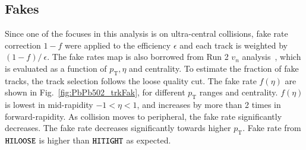 \subsection{Fakes}
Since one of the focuses in this analysis is on ultra-central collisions, fake rate correction $1-f$ were applied to the efficiency $\epsilon$ and each track is weighted by $(1-f)/\ \epsilon$. The fake rates map is also borrowed from Run 2 $v_n$ analysis~\cite{Burka:2151932}, which is evaluated as a function of $p_{\text{T}}, \eta$ and centrality. To estimate the fraction of fake tracks, the track selection follows the loose quality cut. The fake rate $f(\eta)$ are shown in Fig.~\ref{fig:PbPb502_trkFak}, for different $p_{\text{T}}$ ranges and centrality. $f(\eta)$ is lowest in mid-rapidity $-1<\eta<1$, and increases by more than 2 times in forward-rapidity. As collision moves to peripheral, the fake rate significantly decreases. The fake rate decreases significantly towards higher $p_{\text{T}}$. Fake rate from $\verb|HILOOSE|$ is higher than $\verb|HITIGHT|$ as expected.
